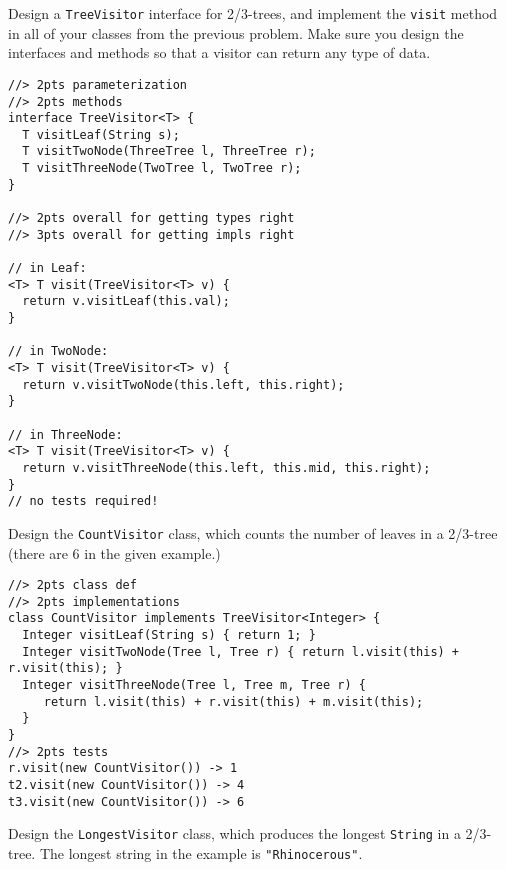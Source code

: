 \documentclass[12pt]{article}                   %
\def\pts#1{\marginpar{\footnotesize \raggedright  \fbox{#1 {\sc Points}}}}
\newenvironment{solution}{\color{red}}{}
\begin{document}
\begin{problem}\pts{22}

Design a \verb|TreeVisitor| interface for 2/3-trees, and implement the
\verb|visit| method in all of your classes from the previous problem.
Make sure you design the interfaces and methods so that a visitor can
return any type of data.

\begin{solution}
\begin{verbatim}
//> 2pts parameterization
//> 2pts methods
interface TreeVisitor<T> {
  T visitLeaf(String s);
  T visitTwoNode(ThreeTree l, ThreeTree r);
  T visitThreeNode(TwoTree l, TwoTree r);
}

//> 2pts overall for getting types right
//> 3pts overall for getting impls right

// in Leaf:
<T> T visit(TreeVisitor<T> v) { 
  return v.visitLeaf(this.val);
}

// in TwoNode:
<T> T visit(TreeVisitor<T> v) { 
  return v.visitTwoNode(this.left, this.right);
}

// in ThreeNode:
<T> T visit(TreeVisitor<T> v) { 
  return v.visitThreeNode(this.left, this.mid, this.right);
}
// no tests required!
\end{verbatim}
\end{solution}

\newpage

\ifrubric{}
\newpage
\fi


Design the \verb|CountVisitor| class, which counts the number of
leaves in a 2/3-tree (there are 6 in the given example.)

\begin{solution}
\begin{verbatim}
//> 2pts class def
//> 2pts implementations
class CountVisitor implements TreeVisitor<Integer> {
  Integer visitLeaf(String s) { return 1; }
  Integer visitTwoNode(Tree l, Tree r) { return l.visit(this) + r.visit(this); }
  Integer visitThreeNode(Tree l, Tree m, Tree r) { 
     return l.visit(this) + r.visit(this) + m.visit(this);
  }
}
//> 2pts tests
r.visit(new CountVisitor()) -> 1
t2.visit(new CountVisitor()) -> 4
t3.visit(new CountVisitor()) -> 6
\end{verbatim}
\end{solution}

\newpage

Design the \verb|LongestVisitor| class, which produces the longest
\verb|String| in a 2/3-tree.  The longest string in the example is
\verb|"Rhinocerous"|.  


\end{problem}
\end{document}
